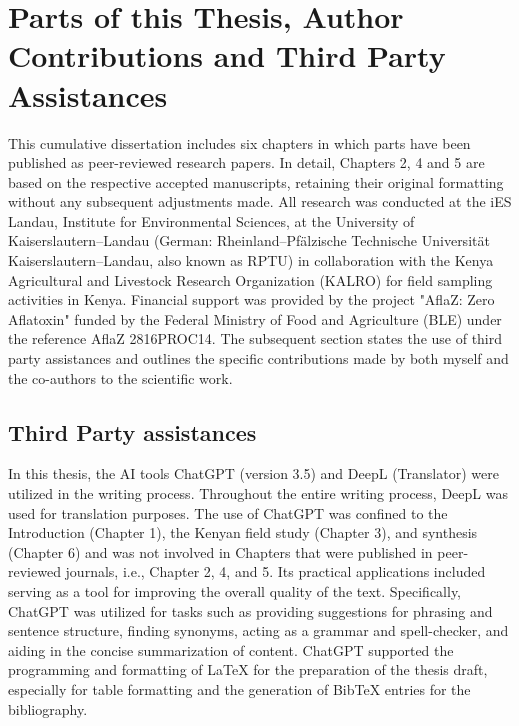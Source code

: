 \chapter*{Parts of this Thesis, Author Contributions and Third Party Assistances}

This cumulative dissertation includes six chapters in which parts have been published as peer-reviewed research papers. In detail, Chapters 2, 4 and 5 are based on the respective accepted manuscripts, retaining their original formatting without any subsequent adjustments made. All research was conducted at the iES Landau, Institute for Environmental Sciences, at the University of Kaiserslautern--Landau (German: Rheinland--Pfälzische Technische Universität Kaiserslautern--Landau, also known as RPTU) in collaboration with the Kenya Agricultural and Livestock Research Organization (KALRO) for field sampling activities in Kenya. Financial support was provided by the project "AflaZ: Zero Aflatoxin" funded by the Federal Ministry of Food and Agriculture (BLE) under the reference AflaZ 2816PROC14. The subsequent section states the use of third party assistances and outlines the specific contributions made by both myself and the co-authors to the scientific work.

\section*{Third Party assistances}

In this thesis, the AI tools ChatGPT (version 3.5) and DeepL (Translator) were utilized in the writing process. Throughout the entire writing process, DeepL was used for translation purposes. The use of ChatGPT was confined to the Introduction (Chapter 1), the Kenyan field study (Chapter 3), and synthesis (Chapter 6) and was not involved in Chapters that were published in peer-reviewed journals, i.e., Chapter 2, 4, and 5. Its practical applications included serving as a tool for improving the overall quality of the text. Specifically, ChatGPT was utilized for tasks such as providing suggestions for phrasing and sentence structure, finding synonyms, acting as a grammar and spell-checker, and aiding in the concise summarization of content. ChatGPT supported the programming and formatting of LaTeX for the preparation of the thesis draft, especially for table formatting and the generation of BibTeX entries for the bibliography.

